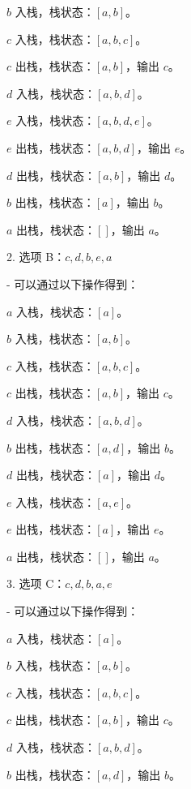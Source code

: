\documentclass[lang=cn,newtx,10pt,scheme=chinese]{../../../elegantbook}
\begin{document}
\begin{enumerate}
            $b$ 入栈，栈状态：$[a, b]$。

            $c$ 入栈，栈状态：$[a, b, c]$。

            $c$ 出栈，栈状态：$[a, b]$，输出 $c$。

            $d$ 入栈，栈状态：$[a, b, d]$。

            $e$ 入栈，栈状态：$[a, b, d, e]$。

            $e$ 出栈，栈状态：$[a, b, d]$，输出 $e$。

            $d$ 出栈，栈状态：$[a, b]$，输出 $d$。

            $b$ 出栈，栈状态：$[a]$，输出 $b$。

            $a$ 出栈，栈状态：$[]$，输出 $a$。

    2. 选项 B：$c, d, b, e, a$

         - 可以通过以下操作得到：
     
                $a$ 入栈，栈状态：$[a]$。
    
                $b$ 入栈，栈状态：$[a, b]$。
    
                $c$ 入栈，栈状态：$[a, b, c]$。
    
                $c$ 出栈，栈状态：$[a, b]$，输出 $c$。
    
                $d$ 入栈，栈状态：$[a, b, d]$。
    
                $b$ 出栈，栈状态：$[a, d]$，输出 $b$。
    
                $d$ 出栈，栈状态：$[a]$，输出 $d$。
    
                $e$ 入栈，栈状态：$[a, e]$。
    
                $e$ 出栈，栈状态：$[a]$，输出 $e$。
    
                $a$ 出栈，栈状态：$[]$，输出 $a$。

    3. 选项 C：$c, d, b, a, e$

            - 可以通过以下操作得到：
        
                    $a$ 入栈，栈状态：$[a]$。
        
                    $b$ 入栈，栈状态：$[a, b]$。
        
                    $c$ 入栈，栈状态：$[a, b, c]$。
        
                    $c$ 出栈，栈状态：$[a, b]$，输出 $c$。
        
                    $d$ 入栈，栈状态：$[a, b, d]$。
        
                    $b$ 出栈，栈状态：$[a, d]$，输出 $b$。
        

\end{enumerate}
\end{document}
